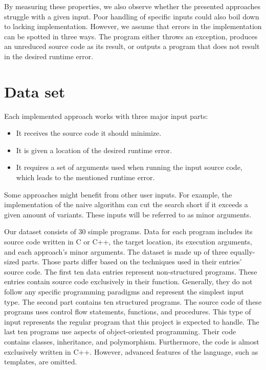By measuring these properties, we also observe whether the presented 
approaches struggle with a given input. 
Poor handling of specific inputs could also boil down to lacking 
implementation. 
However, we assume that errors in the implementation can be spotted in three 
ways. 
The program either throws an exception, produces an unreduced source code as 
its result, or outputs a program that does not result in the desired runtime 
error.

\section{Data set}

Each implemented approach works with three major input parts:
\begin{itemize}
  \item It receives the source code it should minimize.
  \item It is given a location of the desired runtime error.
  \item It requires a set of arguments used when running the input source 
  code, which leads to the mentioned runtime error.
\end{itemize}
Some approaches might benefit from other user inputs. 
For example, the implementation of the naive algorithm can cut the search 
short if it exceeds a given amount of variants. 
These inputs will be referred to as minor arguments.

Our dataset consists of 30 simple programs. 
Data for each program includes its source code written in C or C++, 
the target location, its execution arguments, and each approach's minor 
arguments. 
The dataset is made up of three equally-sized parts. 
Those parts differ based on the techniques used in their entries' source code. 
The first ten data entries represent non-structured programs. 
These entries contain source code exclusively in their  function. 
Generally, they do not follow any specific programming paradigms and 
represent the simplest input type. 
The second part contains ten structured programs. 
The source code of these programs uses control flow statements, functions, 
and procedures. 
This type of input represents the regular program that this project is 
expected to handle. 
The last ten programs use aspects of object-oriented programming. 
Their code contains classes, inheritance, and polymorphism. 
Furthermore, the code is almost exclusively written in C++. 
However, advanced features of the language, such as templates, are omitted.

